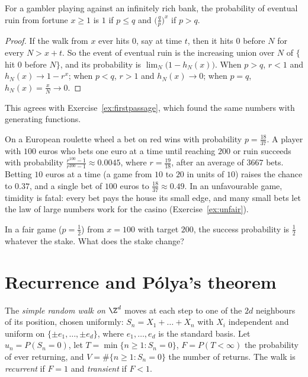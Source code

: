 \begin{corollary}\label{cor:infinitebank}
For a gambler playing against an infinitely rich bank, the probability of eventual ruin from fortune $x\ge1$ is $1$
if $p\le q$ and $\bigl(\frac qp\bigr)^x$ if $p>q$.
\end{corollary}
\begin{proof}
If the walk from $x$ ever hits $0$, say at time $t$, then it hits $0$ before $N$ for every $N>x+t$. So the event of eventual ruin is
the increasing union over $N$ of $\{$hit $0$ before $N\}$, and its probability is $\lim_N\bigl(1-h_N(x)\bigr)$. When $p>q$, $r<1$ and $h_N(x)\to1-r^x$; when
$p<q$, $r>1$ and $h_N(x)\to0$; when $p=q$, $h_N(x)=\frac xN\to0$.
\end{proof}

This agrees with Exercise~\ref{ex:firstpassage}, which found the same numbers with generating functions.

\begin{example}
On a European roulette wheel a bet on red wins with probability $p=\frac{18}{37}$. A player with $100$ euros who bets one
euro at a time until reaching $200$ or ruin succeeds with probability $\frac{r^{100}-1}{r^{200}-1}\approx0.0045$, where $r=\frac{19}{18}$, after an
average of $3667$ bets. Betting $10$ euros at a time (a game from $10$ to $20$ in units of $10$) raises the chance to $0.37$,
and a single bet of $100$ euros to $\frac{18}{37}\approx0.49$. In an unfavourable game, timidity is fatal: every bet pays the house
its small edge, and many small bets let the law of large numbers work for the casino (Exercise~\ref{ex:unfair}).
\end{example}

\begin{think}
In a fair game ($p=\frac12$) from $x=100$ with target $200$, the success probability is $\frac12$ whatever the stake. What does the
stake change?
\end{think}

\section{Recurrence and Pólya's theorem}

The \emph{simple random walk on $\Z^d$} moves at each step to one of the $2d$ neighbours of its position, chosen uniformly:
$S_n=X_1+\dots+X_n$ with $X_i$ independent and uniform on $\{\pm e_1,\dots,\pm e_d\}$, where $e_1,\dots,e_d$ is the standard basis. Let $u_n=P(S_n=0)$,
let $T=\min\{n\ge1:S_n=0\}$, $F=P(T<\infty)$ the probability of ever returning, and $V=\#\{n\ge1:S_n=0\}$ the number of
returns. The walk is \emph{recurrent} if $F=1$ and \emph{transient} if $F<1$.


